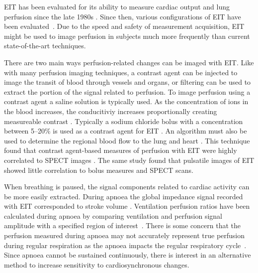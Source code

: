 EIT has been evaluated for its ability to measure cardiac output and
lung perfusion since the late 1980s
\parencite{eyuboglu_vivo_1989,zadehkoochak_pulmonary_1992,brown_blood_1992,frerichs_regional_2002}.
Since then, various configurations of EIT have been 
evaluated~\parencite{borges_regional_2012,nguyen_perfusion_2015}.
Due to the speed and safety of measurement acquisition, EIT might be used to image
perfusion in subjects much more frequently than current state-of-the-art techniques.

There are two main ways perfusion-related changes can be imaged with EIT. Like with many 
perfusion imaging techniques, a contrast agent can be injected to image the transit 
of blood through vessels and organs, or filtering can be used to extract the portion 
of the signal related to perfusion.
To image perfusion using a contrast agent a saline solution is typically used.
As the concentration of ions in 
the blood increases, the conducitiviy increases proportionally
creating measureable contrast
\parencite{sola_non-invasive_2011}.
Typically a sodium chloride bolus with a concentration between 
5--20\% is used as a contrast agent for EIT \parencite{nguyen_review_2012}. 
An algorithm must also be used to determine the regional blood flow to the lung and heart
\parencite{borges_regional_2012}. This technique found that contrast agent-based 
measures of perfusion with EIT
were highly correlated to SPECT images
\parencite{borges_regional_2012}.
The same study found that pulsatile images of EIT showed little correlation to bolus measures 
and SPECT scans. 

When breathing is paused, the signal components related to 
cardiac activity can be more easily extracted. 
During apnoea the global impedance signal
recorded with EIT corresponded to stroke volume
\parencite{fagerberg_electrical_2009}.
Ventilation perfusion ratios have been calculated during apnoea by comparing 
ventilation and perfusion signal amplitude with a specified region of 
interest~\parencite{fagerberg_electrical_2009}.
There is some concern that the perfusion measured 
during apnoea may not accurately represent 
true perfusion during regular respiration as the apnoea 
impacts the regular respiratory cycle~\parencite{leonhardt_electrical_2012}.
Since 
apnoea cannot be sustained continuously, there is interest in an alternative method 
to increase sensitivity to cardiosynchronous changes. 

